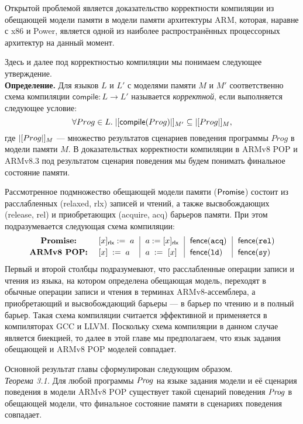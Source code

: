 Открытой проблемой является доказательство корректности компиляции из обещающей модели памяти в модели памяти архитектуры
ARM, которая, наравне с x86 и Power, является одной из наиболее распространённых процессорных архитектур на данный момент.

Здесь и далее под корректностью компиляции мы понимаем следующее утверждение.\\
\textbf{Определение.} Для языков $L$ и $L'$ с моделями памяти $M$ и $M'$ соответственно схема компиляции $\textsf{compile} : L \rightarrow L'$
называется \emph{корректной}, если выполняется следующее условие:
\[ \forall Prog \in L. \; |[\textsf{compile}(Prog)|]_{M'} \subseteq |[Prog|]_{M}, \]
где $|[Prog|]_{M}$ --- множество результатов сценариев поведения программы $Prog$ в модели памяти $M$.
В доказательствах корректности компиляции в ARMv8 POP и ARMv8.3 под результатом сценария поведения мы будем
понимать финальное состояние памяти.

Рассмотренное подмножество обещающей модели памяти ($\mathsf{Promise}$) состоит из расслабленных (relaxed, rlx) записей и чтений,
а также высвобождающих (release, rel) и приобретающих (acquire, acq) барьеров памяти. При этом подразумевается следующая
схема компиляции:
\[
  \begin{array}{c@{~~}@{~~}l@{~~}|@{~~}l@{~~}|@{~~}l@{~~}|@{~~}l}
    \textbf{Promise:}   & [x]_{\textsf{rlx}} := \; a & a := [x]_{\textsf{rlx}}  &  \acqFence & \relFence \\[2pt]
    \textbf{ARMv8 POP:} & \writeInst{x}{a}    & \readInst{a}{x}  &  \dmbLD & \dmbSY \\
  \end{array}
\]
Первый и второй столбцы подразумевают, что расслабленные операции записи и чтения из языка, на котором определена обещающая модель,
переходят в обычные операции записи и чтения в терминах ARMv8-ассемблера, а приобретающий и высвобождающий барьеры --- в барьер
по чтению и в полный барьер. Такая схема компиляции считается эффективной и применяется в компиляторах GCC и LLVM.
Поскольку схема компиляции в данном случае является биекцией, то далее в этой главе мы предполагаем, что язык задания обещающей и ARMv8 POP
моделей совпадает.

Основной результат главы %
сформулирован следующим образом. \\
\emph{Теорема 3.1.} Для любой программы $\mathit{Prog}$ на языке задания модели и её сценария поведения в модели ARMv8 POP существует
такой сценарий поведения $\mathit{Prog}$ в обещающей модели, что финальное состояние памяти в сценариях поведения совпадает.

